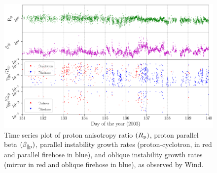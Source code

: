             \begin{figure}
                \begin{center}
                    \includegraphics[width=1.\textwidth]{figures/chap5/wind_all_piecewise_2003-5-11_2003-5-19_01207878_01212368.pdf}
                    \caption[Time series plot of $\beta_{\parallel \rm p}, R_{\rm p}, J_{\rm z}
                             \mathrm{\,and\,} \gamma$ for \texttt{wnd} dataset]{Time series plot of
                             proton anisotropy ratio $(R_{\rm p})$, proton parallel beta
                             $(\beta_{\parallel \rm p})$, parallel instability growth rates
                             (proton-cyclotron, in red and parallel firehose in blue), and oblique
                             instability growth rates (mirror in red and oblique firehose in blue),
                             as observed by Wind.}
                    \label{fig:brjwnd}
                \end{center}
            \end{figure}

